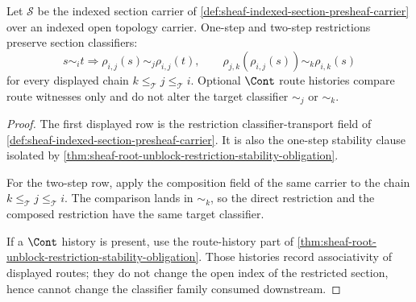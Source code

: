 \begin{theorem}
\label{thm:sheaf-root-cover-nerve-restriction-route-stability}
Let $\mathcal{S}$ be the indexed section carrier of \autoref{def:sheaf-indexed-section-presheaf-carrier} over an indexed open topology carrier. One-step and two-step restrictions preserve section classifiers:
$$
s\sim_i t
\Longrightarrow
\rho_{i,j}(s)\sim_j\rho_{i,j}(t),
\qquad
\rho_{j,k}(\rho_{i,j}(s))\sim_k\rho_{i,k}(s)
$$
for every displayed chain $k\le_{\mathcal{T}}j\le_{\mathcal{T}}i$. Optional $\Cont$ route histories compare route witnesses only and do not alter the target classifier $\sim_j$ or $\sim_k$.
\end{theorem}
\begin{proof}
The first displayed row is the restriction classifier-transport field of \autoref{def:sheaf-indexed-section-presheaf-carrier}. It is also the one-step stability clause isolated by \autoref{thm:sheaf-root-unblock-restriction-stability-obligation}.

For the two-step row, apply the composition field of the same carrier to the chain $k\le_{\mathcal{T}}j\le_{\mathcal{T}}i$. The comparison lands in $\sim_k$, so the direct restriction and the composed restriction have the same target classifier.

If a $\Cont$ history is present, use the route-history part of \autoref{thm:sheaf-root-unblock-restriction-stability-obligation}. Those histories record associativity of displayed routes; they do not change the open index of the restricted section, hence cannot change the classifier family consumed downstream.
\end{proof}

